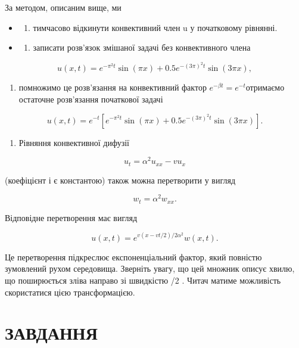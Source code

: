 \documentclass[
  ukrainian,
]{article}
\providecommand{\tightlist}{%
  \setlength{\itemsep}{0pt}\setlength{\parskip}{0pt}}
\begin{document}
За методом, описаним вище, ми

\begin{itemize}
\tightlist
\item
  \begin{enumerate}
  \def\labelenumi{\alph{enumi})}
  \tightlist
  \item
    тимчасово відкинути конвективний член u у початковому рівнянні.
  \end{enumerate}
\item
  \begin{enumerate}
  \def\labelenumi{\alph{enumi})}
  \setcounter{enumi}{1}
  \tightlist
  \item
    записати розв'язок змішаної задачі без конвективного члена
  \end{enumerate}
\end{itemize}

\[
u(x, t) = e^{-\pi^2 t} \sin(\pi x) + 0.5e^{-(3\pi)^2 t} \sin(3\pi x),
\]

\begin{enumerate}
\def\labelenumi{\alph{enumi})}
\setcounter{enumi}{2}
\tightlist
\item
  помножимо це розв'язання на конвективний фактор
  \(e^{-\beta t}=e^{-t}\)отримаємо остаточне розв'язання початкової
  задачі
\end{enumerate}

\[
u(x, t) = e^{-t} \left[ e^{-\pi^2 t} \sin(\pi x) + 0.5e^{-(3\pi)^2 t} \sin(3\pi x) \right].
\]

\begin{enumerate}
\def\labelenumi{\arabic{enumi}.}
\setcounter{enumi}{1}
\tightlist
\item
  Рівняння конвективної дифузії
\end{enumerate}

\[
u_t = \alpha^2 u_{xx} - v u_x
\]

(коефіцієнт і є константою) також можна перетворити у вигляд

\[
w_t = \alpha^2 w_{xx}.
\]

Відповідне перетворення має вигляд

\[
u(x, t) = e^{v(x-vt/2)/2\alpha^2}w(x, t).
\]

Це перетворення підкреслює експоненціальний фактор, який повністю
зумовлений рухом середовища. Зверніть увагу, що цей множник описує
хвилю, що поширюється зліва направо зі швидкістю \upsilon/2 . Читач
матиме можливість скористатися цією трансформацією.

\section{ЗАВДАННЯ}\label{ux437ux430ux432ux434ux430ux43dux43dux44f-6}
\end{document}
